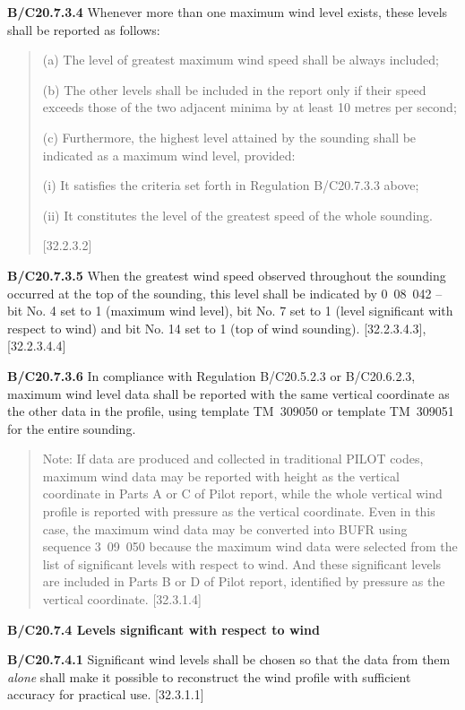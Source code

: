 \textbf{B/C20.7.3.4} Whenever more than one maximum wind level exists, these levels shall be reported as follows:

\begin{quote}
(a) The level of greatest maximum wind speed shall be always included;

(b) The other levels shall be included in the report only if their speed exceeds those of the two adjacent minima by at least 10 metres per second;

(c) Furthermore, the highest level attained by the sounding shall be indicated as a maximum wind level, provided:

(i) It satisfies the criteria set forth in Regulation B/C20.7.3.3 above;

(ii) It constitutes the level of the greatest speed of the whole sounding.

{[}32.2.3.2{]}
\end{quote}

\textbf{B/C20.7.3.5} When the greatest wind speed observed throughout the sounding occurred at the top of the sounding, this level shall be indicated by 0~08~042 -- bit No. 4 set to 1 (maximum wind level), bit No. 7 set to 1 (level significant with respect to wind) and bit No. 14 set to 1 (top of wind sounding). {[}32.2.3.4.3{]}, {[}32.2.3.4.4{]}

\textbf{B/C20.7.3.6} In compliance with Regulation B/C20.5.2.3 or B/C20.6.2.3, maximum wind level data shall be reported with the same vertical coordinate as the other data in the profile, using template TM~309050 or template TM~309051 for the entire sounding.

\begin{quote}
Note: If data are produced and collected in traditional PILOT codes, maximum wind data may be reported with height as the vertical coordinate in Parts A or C of Pilot report, while the whole vertical wind profile is reported with pressure as the vertical coordinate. Even in this case, the maximum wind data may be converted into BUFR using sequence 3~09~050 because the maximum wind data were selected from the list of significant levels with respect to wind. And these significant levels are included in Parts B or D of Pilot report, identified by pressure as the vertical coordinate. {[}32.3.1.4{]}
\end{quote}

\textbf{B/C20.7.4 Levels significant with respect to wind}

\textbf{B/C20.7.4.1} Significant wind levels shall be chosen so that the data from them \emph{alone} shall make it possible to reconstruct the wind profile with sufficient accuracy for practical use. {[}32.3.1.1{]}

